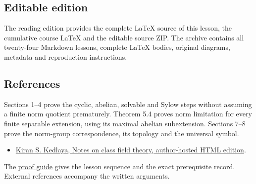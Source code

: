 \documentclass[11pt,a4paper]{article}
\newcommand{\tightlist}{\setlength{\itemsep}{0pt}\setlength{\parskip}{0pt}}
\begin{document}
\subsection{Editable edition}\label{editable-edition}

The reading edition provides the complete LaTeX source of this lesson,
the cumulative course LaTeX and the editable source ZIP. The archive
contains all twenty-four Markdown lessons, complete LaTeX bodies,
original diagrams, metadata and reproduction instructions.

\subsection{References}\label{references}

Sections 1--4 prove the cyclic, abelian, solvable and Sylow steps
without assuming a finite norm quotient prematurely. Theorem 5.4 proves
norm limitation for every finite separable extension, using its maximal
abelian subextension. Sections 7--8 prove the norm-group correspondence,
its topology and the universal symbol.

\begin{itemize}
\tightlist
\item
  \href{https://kskedlaya.org/cft/sec_abstractcft1.html}{Kiran S.
  Kedlaya, Notes on class field theory, author-hosted HTML edition}.
\end{itemize}

The \href{../free-proofs.html}{proof guide} gives the lesson sequence
and the exact prerequisite record. External references accompany the
written arguments.
\end{document}
